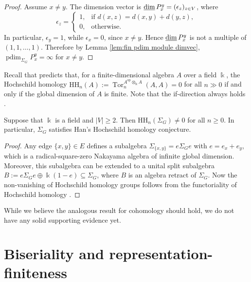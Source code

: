 \documentclass[a4paper,leqno]{amsart}
\begin{document}
\begin{proof}
Assume $x\neq y$. The dimension vector is $\operatorname{\underline{dim}} P_x^y=(\epsilon_z)_{z\in V}$, where
$$
\epsilon_z=
\begin{cases}
1, & \text{if } d(x,z)=d(x,y)+d(y,z),\\
0, & \text{otherwise}.
\end{cases}
$$
In particular, $\epsilon_y=1$, while $\epsilon_x=0$, since $x\neq y$. Hence $\operatorname{\underline{dim}} P_x^y$ is not a multiple of $(1,1,\dots,1)$. Therefore by Lemma \ref{lem:fin pdim module dimvec}, $\operatorname{pdim}_{\Sigma_G} P_x^y=\infty$ for $x\neq y$.
\end{proof}



Recall that  \cite{Han06} predicts that, for a finite-dimensional algebra $A$ over a field $\Bbbk$, the Hochschild homology $\mathrm{HH}_n(A):=\operatorname{Tor}_n^{A^{\operatorname{op}}\otimes_\Bbbk A}(A,A)=0$ for all $n\gg 0$ if and only if the global dimension of $A$ is finite.  Note that the if-direction always holds \cite[Proposition 3.3]{Han06}.

\begin{prop}
Suppose that $\Bbbk$ is a field and $|V|\ge 2$.  Then $\mathrm{HH}_n(\Sigma_G)\neq 0$ for all $n\geq 0$.  In particular, $\Sigma_G$ satisfies Han's Hochschild homology conjecture.
\end{prop}
\begin{proof}
Any edge $\{x,y\}\in E$ defines a subalgebra $\Sigma_{\{x,y\}} = e\Sigma_Ge$ with $e=e_x+e_y$, which is a radical-square-zero Nakayama algebra of infinite global dimension.
Moreover, this subalgebra can be extended to a unital split subalgebra $B:=e\Sigma_Ge\oplus \Bbbk(1-e)\subseteq \Sigma_G$, where $B$ is an algebra retract of $\Sigma_G$.  
Now the non-vanishing of Hochschild homology groups follows from the functoriality of Hochschild homology \cite{Lod98,BM10}. 
\end{proof}
\begin{rmk}
While we believe the analogous result for cohomology should hold, we do not have any solid supporting evidence yet.
\end{rmk}




\section{Biseriality and representation-finiteness}\label{sec:biserial}
\end{document}
